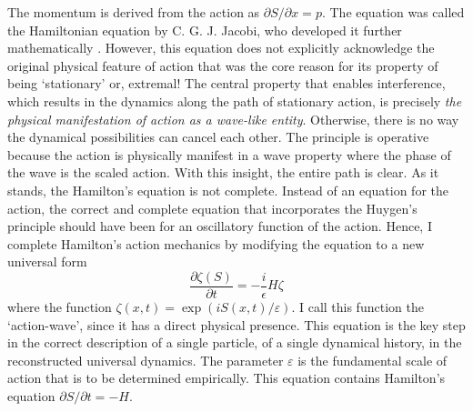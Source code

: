 The momentum is derived from the action as $\partial S/ \partial x = p$. The equation was called the
Hamiltonian equation by C. G. J. Jacobi, who developed it further mathematically \cite{chap27-key7}.
However, this equation does not explicitly acknowledge the original physical feature of action
that was the core reason for its property of being `stationary' or, extremal! The central
property that enables interference, which results in the dynamics along the path of stationary
action, is precisely \textit{the physical manifestation of action as a wave-like entity}. Otherwise, there
is no way the dynamical possibilities can cancel each other. The principle is operative because
the action is physically manifest in a wave property where the phase of the wave is the scaled
action. With this insight, the entire path is clear. As it stands, the Hamilton's equation
is not complete. Instead of an equation for the action, the correct and complete equation
that incorporates the Huygen's principle should have been for an oscillatory function of the
action. Hence, I complete Hamilton's action mechanics by modifying the equation to a new
universal form \cite{chap27-key2}
\begin{equation*}
\frac{\partial \zeta(S)}{\partial t} = - \frac{i}{\epsilon} H \zeta \tag{24}
\end{equation*}
where the function $\zeta(x, t) = \exp(iS(x, t)/\varepsilon)$. I call this function the `action-wave', since it
has a direct physical presence. This equation is the key step in the correct description of a
single particle, of a single dynamical history, in the reconstructed universal dynamics. The
parameter $\varepsilon$ is the fundamental scale of action that is to be determined empirically. This
equation contains Hamilton's equation $\partial S/\partial t = -H$.

